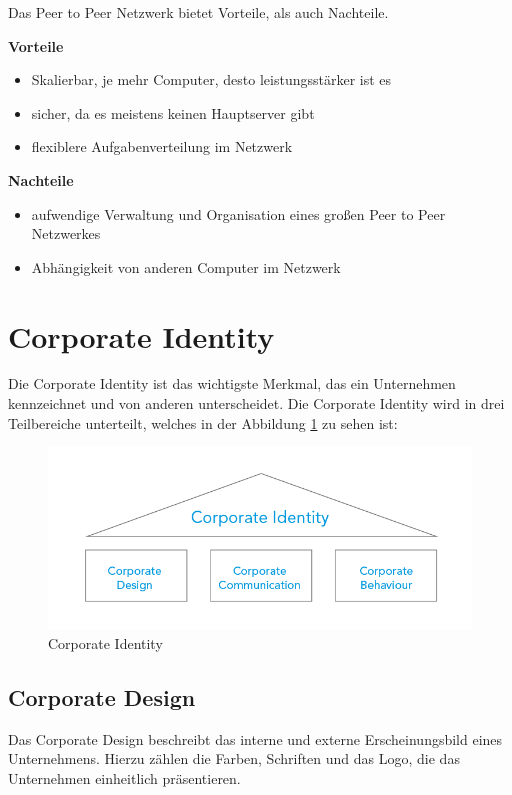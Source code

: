 Das Peer to Peer Netzwerk bietet Vorteile, als auch Nachteile. 

\textbf{Vorteile}
\begin{itemize}
	\item Skalierbar, je mehr Computer, desto leistungsstärker ist es
	\item sicher, da es meistens keinen Hauptserver gibt
	\item flexiblere Aufgabenverteilung im Netzwerk 
\end{itemize}

\textbf{Nachteile}
\begin{itemize}
	\item aufwendige Verwaltung und Organisation eines großen Peer to Peer Netzwerkes 
	\item Abhängigkeit von anderen Computer im Netzwerk
\end{itemize}

\section{Corporate Identity}
Die Corporate Identity ist das wichtigste Merkmal, das ein Unternehmen kennzeichnet und von anderen unterscheidet. Die Corporate Identity wird in drei Teilbereiche unterteilt, welches in der Abbildung \ref{fig:CorporateIdentity} zu sehen ist:

\begin{figure}[H]
	\centering
	\includegraphics[width=0.5\linewidth]{images/CorporateIdentity.png}
	\caption[Corporate Identity]{Corporate Identity}
	\label{fig:CorporateIdentity}
\end{figure}

\subsection{Corporate Design}
Das Corporate Design beschreibt das interne und externe Erscheinungsbild eines Unternehmens. Hierzu zählen die Farben, Schriften und das Logo, die das Unternehmen einheitlich präsentieren. \parencite{CorporateIdentity}

\newpage
